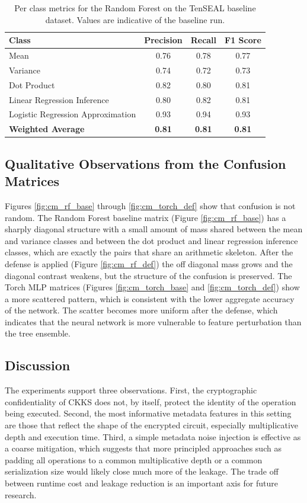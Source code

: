 \documentclass[12pt,a4paper]{article}
\begin{document}
\begin{table}[h]
\centering
\caption{Per class metrics for the Random Forest on the TenSEAL baseline dataset. Values are indicative of the baseline run.}
\label{tab:perclass_rf_tenseal}
\begin{tabular}{lccc}
\toprule
\textbf{Class} & \textbf{Precision} & \textbf{Recall} & \textbf{F1 Score} \\
\midrule
Mean                              & 0.76 & 0.78 & 0.77 \\
Variance                          & 0.74 & 0.72 & 0.73 \\
Dot Product                       & 0.82 & 0.80 & 0.81 \\
Linear Regression Inference       & 0.80 & 0.82 & 0.81 \\
Logistic Regression Approximation & 0.93 & 0.94 & 0.93 \\
\midrule
\textbf{Weighted Average}         & \textbf{0.81} & \textbf{0.81} & \textbf{0.81} \\
\bottomrule
\end{tabular}
\end{table}

\subsection{Qualitative Observations from the Confusion Matrices}
Figures \ref{fig:cm_rf_base} through \ref{fig:cm_torch_def} show that confusion is not random. The Random Forest baseline matrix (Figure \ref{fig:cm_rf_base}) has a sharply diagonal structure with a small amount of mass shared between the mean and variance classes and between the dot product and linear regression inference classes, which are exactly the pairs that share an arithmetic skeleton. After the defense is applied (Figure \ref{fig:cm_rf_def}) the off diagonal mass grows and the diagonal contrast weakens, but the structure of the confusion is preserved. The Torch MLP matrices (Figures \ref{fig:cm_torch_base} and \ref{fig:cm_torch_def}) show a more scattered pattern, which is consistent with the lower aggregate accuracy of the network. The scatter becomes more uniform after the defense, which indicates that the neural network is more vulnerable to feature perturbation than the tree ensemble.

\subsection{Discussion}
The experiments support three observations. First, the cryptographic confidentiality of CKKS does not, by itself, protect the identity of the operation being executed. Second, the most informative metadata features in this setting are those that reflect the shape of the encrypted circuit, especially multiplicative depth and execution time. Third, a simple metadata noise injection is effective as a coarse mitigation, which suggests that more principled approaches such as padding all operations to a common multiplicative depth or a common serialization size would likely close much more of the leakage. The trade off between runtime cost and leakage reduction is an important axis for future research.
\end{document}
